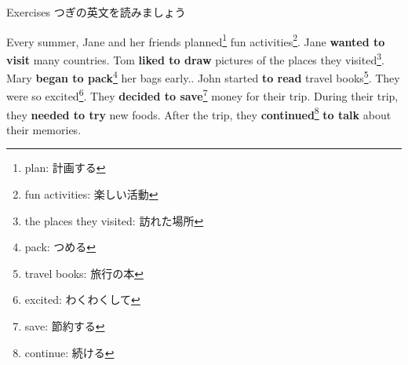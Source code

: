 \documentclass[aspectratio=169,xcolor={dvipsnames,table}]{beamer}
\begin{document}
\begin{frame}[plain]{Exercises}
つぎの英文を読みましょう

Every summer, Jane and her friends planned\footnote{plan: 計画する} fun activities\footnote{fun activities: 楽しい活動}.
Jane {\bfseries wanted to visit} many countries.
Tom {\bfseries liked to draw} pictures of the places they visited\footnote{the places they visited: 訪れた場所}.
Mary {\bfseries began to pack}\footnote{pack: つめる} her bags early..
John started {\bfseries to read} travel books\footnote{travel books: 旅行の本}.
They were so excited\footnote{excited: わくわくして}.
They {\bfseries decided to save}\footnote{save: 節約する} money for their trip.
During their trip, they {\bfseries needed to try} new foods.
After the trip, they { \bfseries continued}\footnote{continue: 続ける} {\bfseries to talk} about their memories.
\end{frame}
\end{document}
